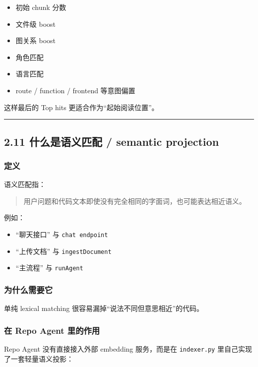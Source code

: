 \documentclass[UTF8,12pt,openany]{ctexbook}
\begin{document}
\begin{itemize}
\item 初始 chunk 分数
\item 文件级 boost
\item 图关系 boost
\item 角色匹配
\item 语言匹配
\item route / function / frontend 等意图偏置
\end{itemize}

这样最后的 Top hits 更适合作为“起始阅读位置”。\par

\hrule

\subsection{2.11 什么是语义匹配 / semantic projection}

\subsubsection{定义}

语义匹配指：\par

\begin{quote}
用户问题和代码文本即使没有完全相同的字面词，也可能表达相近语义。
\end{quote}

例如：\par

\begin{itemize}
\item “聊天接口” 与 \texttt{chat endpoint}
\item “上传文档” 与 \texttt{ingestDocument}
\item “主流程” 与 \texttt{runAgent}
\end{itemize}

\subsubsection{为什么需要它}

单纯 lexical matching 很容易漏掉“说法不同但意思相近”的代码。\par

\subsubsection{在 Repo Agent 里的作用}

Repo Agent 没有直接接入外部 embedding 服务，而是在 \texttt{indexer.py} 里自己实现了一套轻量语义投影：\par
\end{document}
